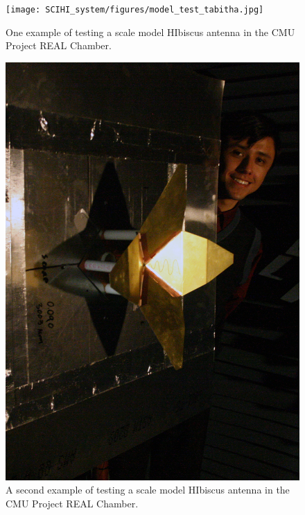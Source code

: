 \begin{figure}[htb]
\centering
\begin{minipage}[b]{0.52\textwidth}
\centering
\texttt{[image: SCIHI\_system/figures/model\_test\_tabitha.jpg]}
\caption{One example of testing a scale model HIbiscus antenna in the CMU Project REAL Chamber. }
\label{Fig:hibiscus_scale_tabitha}
\end{minipage}%
\begin{minipage}[b]{0.02\textwidth}
\hspace{1cm}
\end{minipage}%
\begin{minipage}[b]{0.42\textwidth}
\centering
\includegraphics[width=0.95\linewidth]{SCIHI_system/figures/model_test_jose.jpg}
\caption{A second example of testing a scale model HIbiscus antenna in the CMU Project REAL Chamber.} 
\label{Fig:hibiscus_scale_jose}
\end{minipage}
\end{figure}
 
